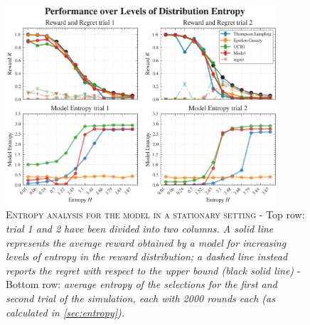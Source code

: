 \begin{figure}[H]
    \centering
    \includegraphics[width=0.9\textwidth]{figures/entropy_performance_plot.png}
    \caption{\textsc{Entropy analysis for the model in a stationary setting} - Top row: \textit{trial 1 and 2 have been divided into two columns. A solid line represents the average reward obtained by a model for increasing levels of entropy in the reward distribution; a dashed line instead reports the regret with respect to the upper bound (black solid line) }
- Bottom row: \textit{average entropy of the selections for the first and second trial of the simulation, each with 2000 rounds each (as calculated in \ref{sec:entropy}).}}
\end{figure}\label{fig:entropy_distr}




